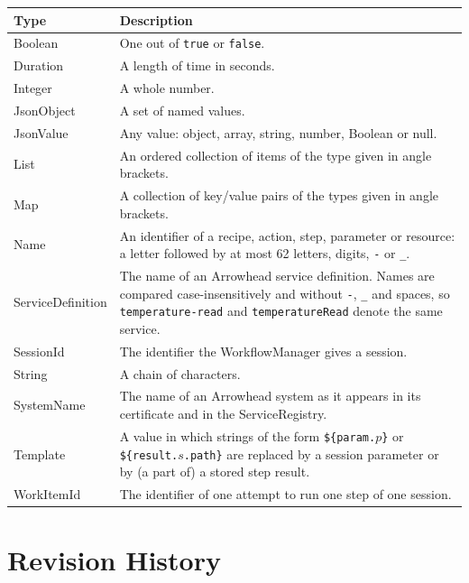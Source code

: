 \documentclass[a4paper]{arrowhead}
\newcommand{\pdef}[1]{{\textcolor{ArrowheadGrey}{#1\label{sec:model:primitives:#1}\label{sec:model:primitives:#1s}\label{sec:model:primitives:#1es}}}}
\begin{document}
{\small
\begin{longtable}{|p{3.2cm}|p{12.6cm}|}

\hline
\rowcolor{gray!33} Type & Description \\ \hline
\endhead
\pdef{Boolean} & One out of \texttt{true} or \texttt{false}. \\ \hline
\pdef{Duration} & A length of time in seconds. \\ \hline
\pdef{Integer} & A whole number. \\ \hline
\pdef{JsonObject} & A set of named values. \\ \hline
\pdef{JsonValue} & Any value: object, array, string, number, Boolean or null. \\ \hline
\pdef{List} & An ordered collection of items of the type given in angle brackets. \\ \hline
\pdef{Map} & A collection of key/value pairs of the types given in angle brackets. \\ \hline
\pdef{Name} & An identifier of a recipe, action, step, parameter or resource: a letter followed by at most 62 letters, digits, \texttt{-} or \texttt{\_}. \\ \hline
\pdef{ServiceDefinition} & The name of an Arrowhead service definition. Names are compared case-insensitively and without \texttt{-}, \texttt{\_} and spaces, so \texttt{temperature-\allowbreak{}read} and \texttt{temperature\allowbreak{}Read} denote the same service. \\ \hline
\pdef{SessionId} & The identifier the WorkflowManager gives a session. \\ \hline
\pdef{String} & A chain of characters. \\ \hline
\pdef{SystemName} & The name of an Arrowhead system as it appears in its certificate and in the ServiceRegistry. \\ \hline
\pdef{Template} & A value in which strings of the form \texttt{\$\{param.$p$\}} or \texttt{\$\{result.$s$.path\}} are replaced by a session parameter or by (a part of) a stored step result. \\ \hline
\pdef{WorkItemId} & The identifier of one attempt to run one step of one session. \\ \hline
\end{longtable}
}


\newpage



\newpage

\section{Revision History}
\end{document}
